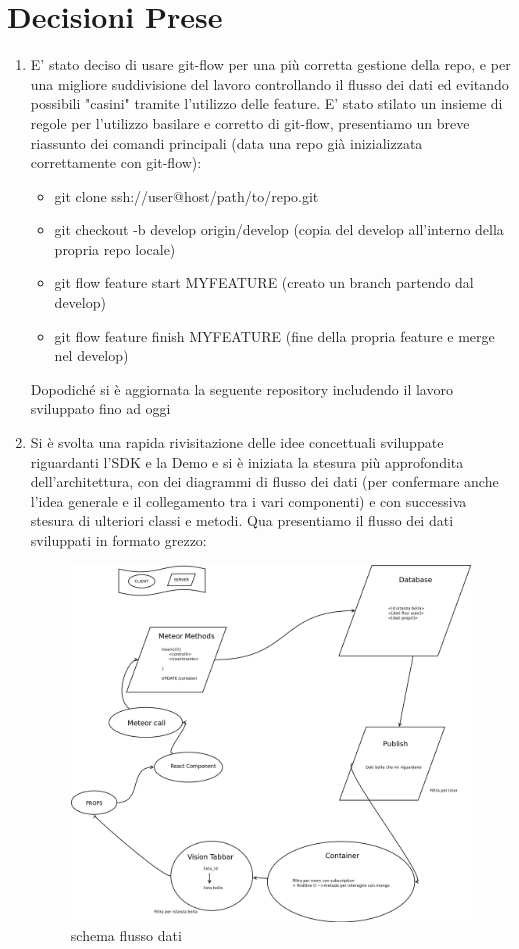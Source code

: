 \documentclass[10 pt,a4paper, openany]{article}
\begin{document}
\section{Decisioni Prese}
\begin{enumerate}
	\item E' stato deciso di usare git-flow per una più corretta gestione della repo, e per una migliore suddivisione del lavoro controllando il flusso dei dati ed evitando possibili "casini" tramite l'utilizzo delle feature.
	E' stato stilato un insieme di regole per l'utilizzo basilare e corretto di git-flow, presentiamo un breve riassunto dei comandi principali (data una repo già inizializzata correttamente con git-flow): 
	\begin{itemize}
		\item git clone ssh://user@host/path/to/repo.git
		\item git checkout -b develop origin/develop (copia del develop all'interno della propria repo locale)
		\item git flow feature start MYFEATURE  (creato un branch partendo dal develop)
		\item git flow feature finish MYFEATURE (fine della propria feature e merge nel develop)
	\end{itemize}
	Dopodiché si è aggiornata la seguente repository includendo il lavoro sviluppato fino ad oggi
	
	\item Si è svolta una rapida rivisitazione delle idee concettuali sviluppate riguardanti l'SDK e la Demo e si è iniziata la stesura più approfondita dell'architettura, con dei diagrammi di flusso dei dati (per confermare anche l'idea generale e il collegamento tra i vari componenti) e con successiva stesura di ulteriori classi e metodi.
	Qua presentiamo il flusso dei dati sviluppati in formato grezzo:
	
		\FloatBarrier
		\begin{figure}[ht]
			\centering
			\includegraphics[scale=0.30]{img/flussoD.png}
			\caption{schema flusso dati}
		\end{figure}
	
\end{enumerate}
\end{document}
